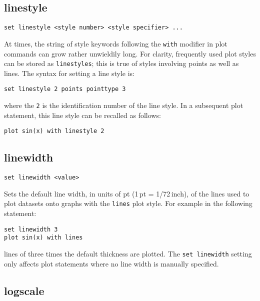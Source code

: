 \subsection{linestyle}

\begin{verbatim}
set linestyle <style number> <style specifier> ...
\end{verbatim}

At times, the string of style keywords following the {\tt with} modifier in plot
commands can grow rather unwieldily long. For clarity, frequently used plot
styles can be stored as {\tt linestyles}; this is true of styles involving
points as well as lines. The syntax for setting a line style is:

\begin{verbatim}
set linestyle 2 points pointtype 3
\end{verbatim}

\noindent where the {\tt 2} is the identification number of the line style.
In a subsequent plot statement, this line style can be recalled as follows:

\begin{verbatim}
plot sin(x) with linestyle 2
\end{verbatim}


\subsection{linewidth}

\begin{verbatim}
set linewidth <value>
\end{verbatim}

Sets the default line width, in units of pt (1\,pt = 1/72\,inch), of the lines
used to plot datasets onto graphs with the {\tt lines} plot style.  For
example in the following statement:

\begin{verbatim}
set linewidth 3
plot sin(x) with lines
\end{verbatim}

\noindent lines of three times the default thickness are plotted.  The
{\tt set linewidth} setting only affects plot statements where no line width is
manually specified.

\subsection{logscale}

